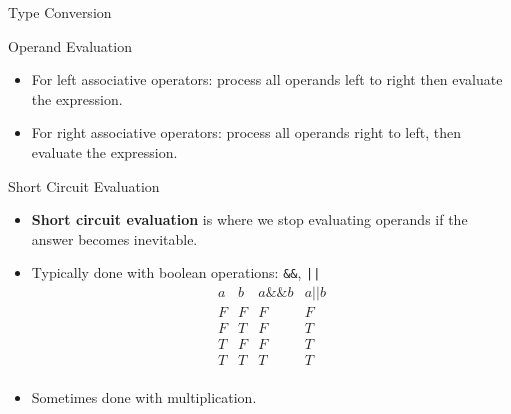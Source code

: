 \documentclass[handout]{beamer}
\newenvironment{code}{%
 \VerbatimEnvironment
 \begin{adjustbox}{max width=\textwidth, max height=0.7\textheight}
 \begin{BVerbatim}
  }{
  \end{BVerbatim}
 \end{adjustbox}
}
\begin{document}
\begin{frame}[fragile]{Type Conversion}
\end{frame}

\begin{frame}{Operand Evaluation}
    \begin{itemize}
        \item For left associative operators: process all operands left to right then evaluate the expression.
        \item For right associative operators: process all operands right to left, then evaluate the expression.
    \end{itemize}
\end{frame}

\begin{frame}{Short Circuit Evaluation}
    \begin{itemize}
        \item \textbf{Short circuit evaluation} is where we stop evaluating operands if the answer becomes inevitable.
        \item Typically done with boolean operations: \texttt{&&}, \texttt{||}
        \[
        \begin{array}{cc|c|c}
        a & b & a \&\& b & a || b \\
        \hline
        F & F & F & F \\
        F & T & F & T \\
        T & F & F & T \\
        T & T & T & T \\
        \end{array}
        \]
        \item Sometimes done with multiplication.
    \end{itemize}
\end{frame}
\end{document}
